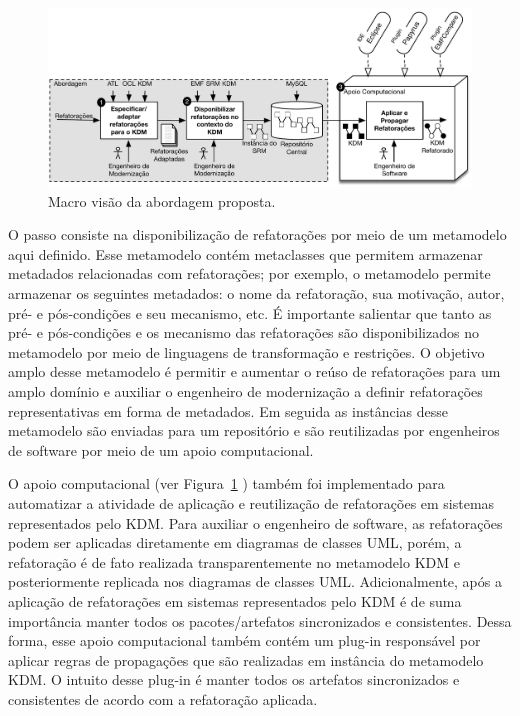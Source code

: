 \begin{figure}[h]
	\centering
	\caption{Macro visão da abordagem proposta.}
	\label{fig:abordagem_kdm_tese_processo}
	\includegraphics[scale=0.75]{images/Micro_visao_do_doutorado3}
	\fautor
\end{figure}

O passo  consiste na disponibilização de refatorações por meio de um metamodelo aqui definido. Esse metamodelo contém metaclasses que permitem armazenar metadados relacionadas com refatorações; por exemplo, o metamodelo permite armazenar os seguintes metadados: o nome da refatoração, sua motivação, autor, pré- e pós-condições e seu mecanismo, etc. É importante salientar que tanto as pré- e pós-condições e os mecanismo das refatorações são disponibilizados no metamodelo por meio de linguagens de transformação e restrições. O objetivo amplo desse metamodelo é permitir e aumentar o reúso de refatorações para um amplo domínio e auxiliar o engenheiro de modernização a definir refatorações representativas em forma de metadados. Em seguida as instâncias desse metamodelo são enviadas para um repositório e são reutilizadas por engenheiros de software por meio de um apoio computacional. 


O apoio computacional (ver Figura~\ref{fig:abordagem_kdm_tese_processo} )  também foi implementado para automatizar a atividade de aplicação e reutilização de refatorações em sistemas representados pelo KDM. Para auxiliar o engenheiro de software, as refatorações podem ser aplicadas diretamente em diagramas de classes UML, porém, a refatoração é de fato realizada transparentemente no metamodelo KDM e posteriormente replicada nos diagramas de classes UML. Adicionalmente, após a aplicação de refatorações em sistemas representados pelo KDM é de suma importância manter todos os pacotes/artefatos sincronizados e consistentes. Dessa forma, esse apoio computacional também contém um plug-in responsável por aplicar regras de propagações que são realizadas em instância do metamodelo KDM. O intuito desse plug-in é manter todos os artefatos sincronizados e consistentes de acordo com a refatoração aplicada.


